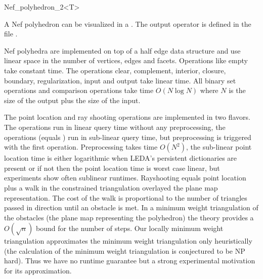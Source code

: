 \begin{ccRefClass}{Nef_polyhedron_2<T>}


A Nef polyhedron  can be visualized in a . 
The output operator is defined in the file 
.
 
\ccImplementation

Nef polyhedra are implemented on top of a half edge data structure and
use linear space in the number of vertices, edges and facets.
Operations like empty take constant time. The operations clear,
complement, interior, closure, boundary, regularization, input and
output take linear time. All binary set operations and comparison
operations take time $O(N \log N)$ where $N$ is the size of the output
plus the size of the input.

The point location and ray shooting operations are implemented in two
flavors. The  operations run in linear query time without
any preprocessing, the  operations (equals )
run in sub-linear query time, but preprocessing is triggered with the
first operation. Preprocessing takes time $O(N^2)$, the sub-linear
point location time is either logarithmic when LEDA's persistent
dictionaries are present or if not then the point location time is
worst case linear, but experiments show often sublinear runtimes.
Rayshooting equals point location plus a walk in the constrained
triangulation overlayed the plane map representation. The cost of the
walk is proportional to the number of triangles passed in direction
 until an obstacle is met. In a minimum weight triangulation of
the obstacles (the plane map representing the polyhedron) the theory
provides a $O(\sqrt{n})$ bound for the number of steps. Our locally
minimum weight triangulation approximates the minimum weight
triangulation only heuristically (the calculation of the minimum
weight triangulation is conjectured to be NP hard). Thus we have no
runtime guarantee but a strong experimental motivation for its
approximation.


\end{ccRefClass}
